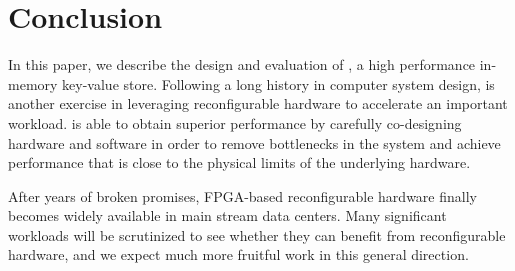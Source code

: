 \section{Conclusion}
\label{kvdirect:sec:conclusion}
In this paper, we describe the design and evaluation of \oursys{}, a high performance in-memory key-value store. Following a long history in computer system design, \oursys{} is another exercise in leveraging reconfigurable hardware to accelerate an important workload. \oursys{} is able to obtain superior performance by carefully co-designing hardware and software in order to remove bottlenecks in the system and achieve performance that is close to the physical limits of the underlying hardware.

After years of broken promises, FPGA-based reconfigurable hardware  finally becomes widely available in main stream data centers. Many significant workloads will be scrutinized to see whether they can benefit from reconfigurable hardware, and we expect much more fruitful work in this general direction. 
